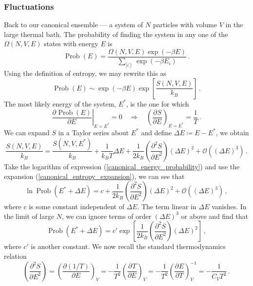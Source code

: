 \documentclass{article}
\theoremstyle{plain}\theoremheaderfont{\normalfont\bfseries}\theorembodyfont{\rmfamily}\theoremseparator{.}\newtheorem*{thm}{Theorem}\newtheorem*{law}{Law}\newtheorem*{pos}{Postulate}
\numberwithin{equation}{section}
\newcommand{\pdv}[3][]{\frac{\partial^{#1} #2}{{\partial #3}^{#1}}}
\newcommand{\ket}[1]{\left| #1 \right\rangle}
\DeclareMathOperator{\Prob}{Prob}
\begin{document}
    \subsubsection{Fluctuations}
    Back to our canonical ensemble --- a system of \(N\) particles with volume \(V\) in the large thermal bath. The probability of finding the system in any one of the \(\Omega(N,V,E)\) states with energy \(E\) is
    \begin{equation}
        \Prob(E)=\frac{\Omega(N,V,E)\exp(-\beta E)}{\sum_{\ket{i}}\exp(-\beta E_i)}\,.
    \end{equation}
    Using the definition of entropy, we may rewrite this as
    \begin{equation}\label{canonical_energy_probability}
        \Prob(E)\sim\exp(-\beta E)\exp\left[\frac{S(N,V,E)}{k_B}\right]\,.
    \end{equation}
    The most likely energy of the system, \(E^*\), is the one for which
    \begin{equation}
        \left.\pdv{\Prob(E)}{E}\right|_{E=E^*}=0\quad\Rightarrow\quad\left(\pdv{S}{E}\right)_{E=E^*}=\frac{1}{T}\,.
    \end{equation}
    We can expand \(S\) in a Taylor series about \(E^*\) and define \(\Delta E\coloneqq E-E^*\), we obtain
    \begin{equation}\label{canonical_entropy_expansion}
        \frac{S(N,V,E)}{k_B}=\frac{S(N,V,E^*)}{k_B}+\frac{1}{k_BT}\Delta E+\frac{1}{2k_B}\left(\pdv[2]{S}{E}\right)(\Delta E)^2+\mathcal{O}((\Delta E)^3)\,.
    \end{equation}
    Take the logarithm of expression (\ref{canonical_energy_probability}) and use the expansion (\ref{canonical_entropy_expansion}), we can see that
    \begin{equation}
        \ln \Prob(E^*+\Delta E)=c+\frac{1}{2k_B}\left(\pdv[2]{S}{E}\right)(\Delta E)^2+\mathcal{O}((\Delta E)^3)\,,
    \end{equation}
    where \(c\) is some constant independent of \(\Delta E\). The term linear in \(\Delta E\) vanishes. In the limit of large \(N\), we can ignore terms of order \((\Delta E)^3\) or above and find that
    \begin{equation}
        \Prob(E^*+\Delta E)=c'\exp\left[\frac{1}{2k_B}\left(\pdv[2]{S}{E}\right)(\Delta E)^2\right]\,,
    \end{equation}
    where \(c'\) is another constant. We now recall the standard thermodynamics relation
    \begin{equation}
        \left(\pdv[2]{S}{E}\right)=\left(\pdv{(1/T)}{E}\right)_V=-\frac{1}{T^2}\left(\pdv{T}{E}\right)_V=-\frac{1}{T^2}\left(\pdv{E}{T}\right)_{V}^{-1}=-\frac{1}{C_V T^2}\,.
    \end{equation}
\end{document}
